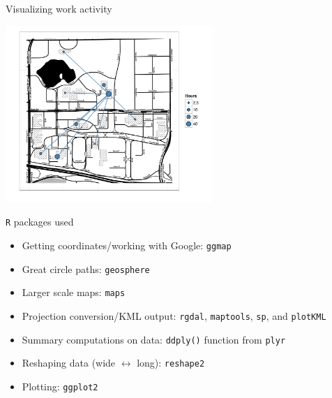 \documentclass[sans,aspectratio=169,presentation,bigger,fleqn]{beamer}
\begin{document}
\begin{frame}[label=sec-33]{Visualizing work activity}
\begin{center}
\includegraphics[height=6.7cm]{./plots/mmm-timesheet.pdf}
\end{center}
\end{frame}
\begin{frame}[fragile,label=sec-34]{\texttt{R} packages used}
 \begin{itemize}
\item Getting coordinates/working with Google: \texttt{ggmap}
\item Great circle paths: \texttt{geosphere}
\item Larger scale maps: \texttt{maps}
\item Projection conversion/KML output: \texttt{rgdal}, \texttt{maptools}, \texttt{sp}, and \texttt{plotKML}
\item Summary computations on data: \texttt{ddply()} function from \texttt{plyr}
\item Reshaping data (wide \(\leftrightarrow\) long): \texttt{reshape2}
\item Plotting: \texttt{ggplot2}
\end{itemize}
\end{frame}
\end{document}
